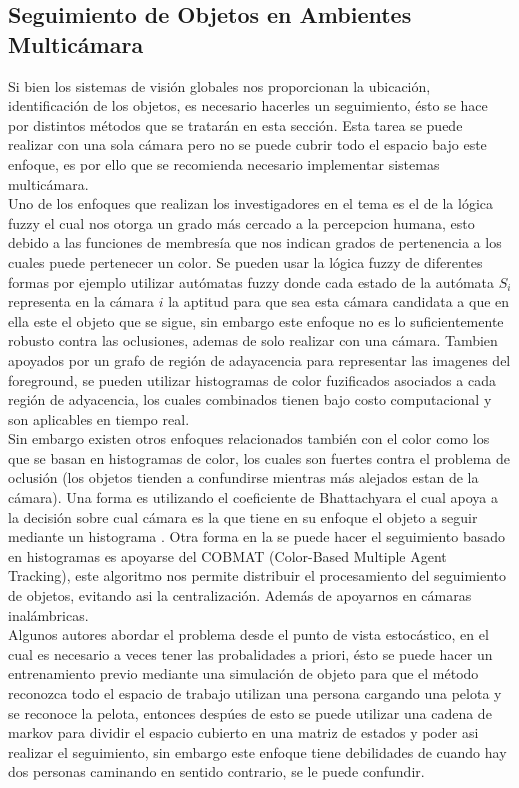 \subsection{\textbf{Seguimiento de Objetos en Ambientes Multic\'amara}}
Si bien los sistemas de visi\'on globales nos proporcionan la ubicaci\'on, identificaci\'on de los objetos, es necesario hacerles un seguimiento, \'esto se hace por distintos m\'etodos que se tratar\'an en esta secci\'on. Esta tarea se puede realizar con una sola c\'amara pero no se puede cubrir todo el espacio bajo este enfoque, es por ello que se recomienda necesario implementar sistemas multic\'amara.\\

Uno de los enfoques que realizan los investigadores en el tema es el de la l\'ogica fuzzy el cual nos otorga un grado m\'as cercado a la percepcion humana, esto debido a las funciones de membres\'ia que nos indican grados de pertenencia  a los cuales puede pertenecer un color. Se pueden usar la l\'ogica fuzzy de diferentes formas por ejemplo utilizar aut\'omatas fuzzy donde cada estado de la aut\'omata $S_i$ representa en la c\'amara $i$ la aptitud para que sea esta c\'amara candidata a que en ella este el objeto que se sigue\cite{morioka_mul}, sin embargo este enfoque no es lo suficientemente robusto contra las oclusiones, ademas de solo realizar con una c\'amara. Tambien apoyados por un grafo de regi\'on de adayacencia para representar las imagenes del foreground, se pueden utilizar histogramas de color fuzificados asociados a cada regi\'on de adyacencia, los cuales combinados tienen bajo costo computacional y son aplicables en tiempo real\cite{hossiein_mul}.\\
Sin embargo existen otros enfoques relacionados tambi\'en  con el color como los que se basan en  histogramas de color, los cuales son fuertes contra el problema de oclusi\'on (los objetos tienden a confundirse mientras m\'as alejados estan de la c\'amara). Una forma es utilizando el coeficiente de Bhattachyara el cual apoya a la decisi\'on sobre cual c\'amara es la que tiene en su enfoque el objeto a seguir mediante un histograma \cite{nummiaro_mot}. Otra forma en la se puede hacer el seguimiento basado en histogramas es apoyarse del COBMAT (Color-Based Multiple Agent Tracking), este algoritmo nos permite distribuir el procesamiento del seguimiento de objetos, evitando asi la centralizaci\'on. Adem\'as de apoyarnos en c\'amaras inal\'ambricas\cite{oto_mul}.  \\
Algunos autores abordar el problema desde el punto de vista estoc\'astico,  en el cual es necesario a veces tener las probalidades a priori, \'esto se puede hacer un entrenamiento previo mediante una simulaci\'on de objeto para que el m\'etodo reconozca todo el espacio de trabajo utilizan una persona cargando una pelota y se reconoce la pelota, entonces desp\'ues de esto se puede utilizar una cadena de markov para dividir el espacio cubierto en una matriz de estados  y poder asi realizar el seguimiento\cite{Dick_mot}, sin embargo este enfoque tiene debilidades de cuando hay dos personas caminando en sentido contrario, se le puede confundir. \\

